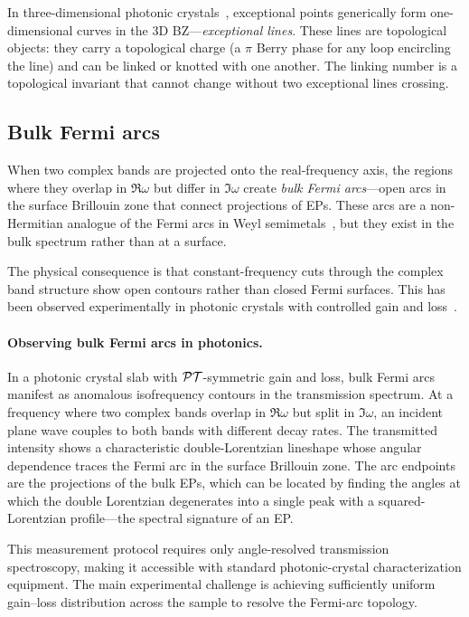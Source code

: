 In three-dimensional photonic crystals~\cite{chen2021ideal,pan2023real,liu2021observation}, exceptional points generically
form one-dimensional curves in the 3D BZ---\emph{exceptional lines}.
These lines are topological objects: they carry a topological charge
(a $\pi$ Berry phase for any loop encircling the line) and can be linked
or knotted with one another. The linking number is a topological
invariant that cannot change without two exceptional lines crossing.

\subsection{Bulk Fermi arcs}
\label{ssec:fermi-arcs}

When two complex bands are projected onto the real-frequency axis, the
regions where they overlap in $\Re\omega$ but differ in $\Im\omega$
create \emph{bulk Fermi arcs}---open arcs in the surface Brillouin zone
that connect projections of EPs. These arcs are a non-Hermitian
analogue of the Fermi arcs in Weyl semimetals~\cite{park2022nodal}, but they exist in the
bulk spectrum rather than at a surface.

The physical consequence is that constant-frequency cuts through the
complex band structure show open contours rather than closed Fermi
surfaces. This has been observed experimentally in photonic crystals
with controlled gain and loss~\cite{he2016acoustic,zhang2021acoustic}.

\paragraph{Observing bulk Fermi arcs in photonics.}
In a photonic crystal slab with $\mathcal{PT}$-symmetric gain and loss, bulk
Fermi arcs manifest as anomalous isofrequency contours in the
transmission spectrum. At a frequency where two complex bands overlap
in $\Re\omega$ but split in $\Im\omega$, an incident plane wave couples
to both bands with different decay rates. The transmitted intensity
shows a characteristic double-Lorentzian lineshape whose angular
dependence traces the Fermi arc in the surface Brillouin zone. The
arc endpoints are the projections of the bulk EPs, which can be located
by finding the angles at which the double Lorentzian degenerates into a
single peak with a squared-Lorentzian profile---the spectral signature
of an EP.

This measurement protocol requires only angle-resolved transmission
spectroscopy, making it accessible with standard photonic-crystal
characterization equipment. The main experimental challenge is
achieving sufficiently uniform gain--loss distribution across the
sample to resolve the Fermi-arc topology.


